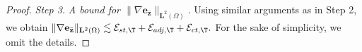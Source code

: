 \documentclass[final]{siamart0216}
\begin{document}
\begin{proof}
\emph{Step 3.} \emph{A bound for $\|\nabla \mathbf{e}_{\bar{\mathbf{z}}}\|_{\mathbf{L}^2(\Omega)}$}. Using similar arguments as in Step 2, we obtain
$
\|\nabla \mathbf{e}_{\bar{\mathbf{z}}}\|_{\mathbf{L}^2(\Omega)}\lesssim \mathcal{E}_{st,\T}+\mathcal{E}_{adj,\T}+\mathcal{E}_{ct,\T}.
$
For the sake of simplicity, we omit the details.


\end{proof}
\end{document}
